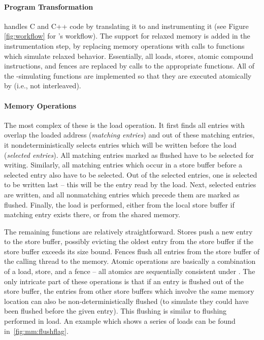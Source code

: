 \paragraph{Program Transformation}%
%
\divine handles C and C++ code by translating it to \llvm and instrumenting it (see Figure \ref{fig:workflow} for \divine's workflow).
The support for relaxed memory is added in the instrumentation step, by replacing memory operations with calls to functions which simulate relaxed behavior.
Essentially, all loads, stores, atomic compound instructions, and fences are replaced by calls to the appropriate functions.
All of the \xtso-simulating functions are implemented so that they are executed atomically by \divine (i.e., not interleaved).

\paragraph{\xtso Memory Operations}
%
The most complex of these is the load operation.
It first finds all entries with overlap the loaded address (\emph{matching entries}) and out of these matching entries, it nondeterministically selects entries which will be written before the load (\emph{selected entries}).
All matching entries marked as flushed have to be selected for writing.
Similarly, all matching entries which occur in a store buffer before a selected entry also have to be selected.
Out of the selected entries, one is selected to be written last -- this will be the entry read by the load.
Next, selected entries are written, and all nonmatching entries which precede them are marked as flushed.
Finally, the load is performed, either from the local store buffer if matching
entry exists there, or from the shared memory.

The remaining functions are relatively straightforward.
Stores push a new entry to the store buffer, possibly evicting the oldest entry
from the store buffer if the store buffer exceeds its size bound.
Fences flush all entries from the store buffer of the calling thread to the
memory.
Atomic operations are basically a combination of a load, store, and a fence --
all atomics are sequentially consistent under \xtso.
The only intricate part of these operations is that if an entry is flushed out
of the store buffer, the entries from other store buffers which involve the
same memory location can also be non-deterministically flushed (to simulate
they could have been flushed before the given entry).
This flushing is similar to flushing performed in load.
An example which shows a series of loads can be found in~\autoref{fig:mm:flushflag}.

